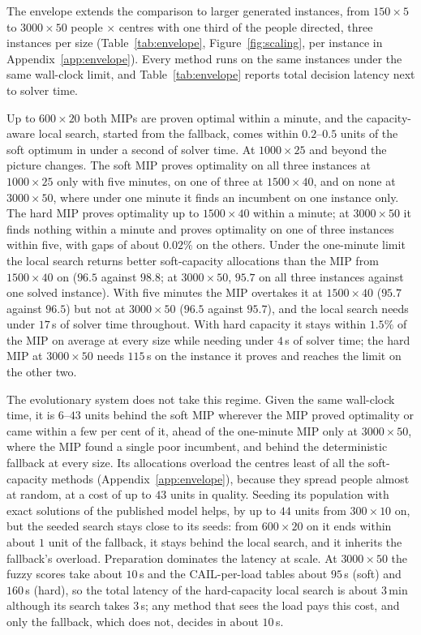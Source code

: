 \documentclass[systems,article,submit,moreauthors,pdftex]{Definitions/mdpi}
\begin{document}
The envelope extends the comparison to larger generated instances, from $150\times5$ to
$3000\times50$ people $\times$ centres with one third of the people directed, three instances per
size (Table~\ref{tab:envelope}, Figure~\ref{fig:scaling}, per instance in
Appendix~\ref{app:envelope}). Every method runs on the same instances under the same wall-clock
limit, and Table~\ref{tab:envelope} reports total decision latency next to solver time.



Up to $600\times20$ both MIPs are proven optimal within a minute, and the capacity-aware local
search, started from the fallback, comes within $0.2$--$0.5$ units of the soft optimum in under a
second of solver time. At $1000\times25$ and beyond the picture changes. The soft MIP proves
optimality on all three instances at $1000\times25$ only with five minutes, on one of three at
$1500\times40$, and on none at $3000\times50$, where under one minute it finds an incumbent on
one instance only. The hard MIP proves optimality up to $1500\times40$ within a minute; at
$3000\times50$ it finds nothing within a minute and proves optimality on one of three instances
within five, with gaps of about $0.02\%$ on the others. Under the one-minute limit the local
search returns better soft-capacity allocations than the MIP from $1500\times40$ on ($96.5$
against $98.8$; at $3000\times50$, $95.7$ on all three instances against one solved instance).
With five minutes the MIP overtakes it at $1500\times40$ ($95.7$ against $96.5$) but not at
$3000\times50$ ($96.5$ against $95.7$), and the local search needs under $17$\,s of solver time
throughout. With hard capacity it stays within $1.5\%$ of the MIP on average at every size while
needing under $4$\,s of solver time; the hard MIP at $3000\times50$ needs $115$\,s on the instance it
proves and reaches the limit on the other two.

The evolutionary system does not take this regime. Given the same wall-clock time, it is
$6$--$43$ units behind the soft MIP wherever the MIP proved optimality or came within a few
per cent of it, ahead of the one-minute MIP only at $3000\times50$, where the MIP found a single
poor incumbent, and behind the deterministic fallback at every size. Its allocations overload the
centres least of all the soft-capacity methods (Appendix~\ref{app:envelope}), because they spread
people almost at random, at a cost of up to $43$ units in quality. Seeding its population with exact solutions of the
published model helps, by up to $44$ units from $300\times10$ on, but the seeded search stays
close to its seeds: from $600\times20$ on it ends within about $1$ unit of the fallback, it stays
behind the local search, and it inherits the fallback's overload. Preparation dominates the
latency at scale. At $3000\times50$ the fuzzy scores take about $10$\,s and the CAIL-per-load
tables about $95$\,s (soft) and $160$\,s (hard), so the total latency of the hard-capacity local
search is about $3$\,min although its search takes $3$\,s; any method that sees the load pays this
cost, and only the fallback, which does not, decides in about $10$\,s.
\end{document}
